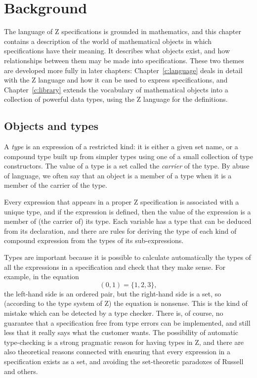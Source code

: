 \chapter{Background}\label{c:background}

\new The language of Z specifications is grounded in mathematics,
and this chapter contains a description of the world of mathematical
objects in which specifications have their meaning. It describes
what objects exist, and how relationships between them may be
made into specifications. These two themes are developed more fully
in later chapters:  Chapter~\ref{c:language} deals in detail with
the Z language and how it can be used to express specifications, and
Chapter~\ref{c:library} extends the vocabulary of mathematical
objects into a collection of powerful data types, using the Z
language for the definitions.

\section{Objects and types}\label{s:types}

\new A {\em type\/}%
is an expression of a restricted kind: it is either a given set
name, or a compound type built up from simpler types using one of a
small collection of type constructors.  The value of a type is a set
called the {\em carrier\/}%
of the type.  By abuse of language, we often say that an object is a
member of a type when it is a member of the carrier of the type.

\new Every expression that appears in a proper Z specification is
associated with a unique type, and if the expression is defined,
then the value of the expression is a member of (the carrier of) its
type.  Each variable has a type that can be deduced from its
declaration, and there are rules for deriving the type of each kind
of compound expression from the types of its sub-expressions.

\new Types are important because it is possible to calculate
automatically the types of all the expressions in a specification and
check that they make sense.  For example, in the
equation
\[ (0, 1) = \{ 1, 2, 3 \}, \]
the left-hand side is an ordered pair, but the right-hand side is
a set, so (according to the type system of Z) the equation is nonsense.
This is the kind of mistake which can be detected by a type checker.
There is, of course, no guarantee that a specification free from
type errors can be implemented, and still less that it really says
what the customer wants.  The possibility of automatic type-checking
is a strong pragmatic reason for having types in Z, and there are also
theoretical reasons connected with ensuring that every expression in
a specification exists as a set, and avoiding the set-theoretic
paradoxes of Russell and others.

